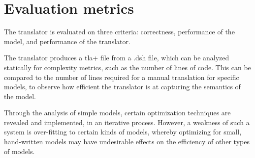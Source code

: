 
\section{Evaluation metrics}

The translator is evaluated on three criteria: correctness, performance of the model, and performance of the translator.

The translator produces a tla+ file from a .dsh file, which can be analyzed statically for complexity metrics, such as the number of lines of code. This can be compared to the number of lines required for a manual translation for specific models, to observe how efficient the translator is at capturing the semantics of the model.

Through the analysis of simple models, certain optimization techniques are revealed and implemented, in an iterative process. However, a weakness of such a system is over-fitting to certain kinds of models, whereby optimizing for small, hand-written models may have undesirable effects on the efficiency of other types of models.